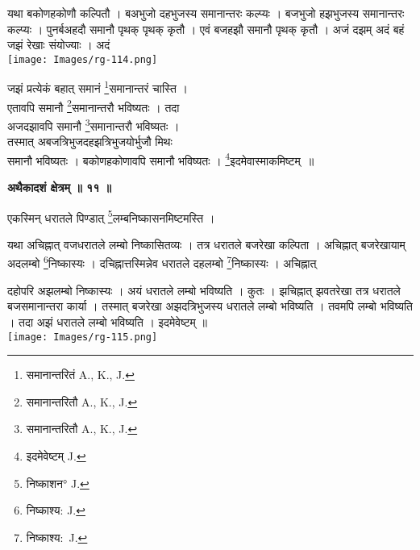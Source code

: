 \documentclass[11pt, openany]{book}
\begin{document}
 \begin{vwcol}[widths={0.7,0.3}, sep=.8cm, rule=0pt] 
 यथा बकोणहकोणौ कल्पितौ । बअभुजो दहभुजस्य समानान्तरः कल्प्यः  । बजभुजो हझभुजस्य समानान्तरः कल्प्यः  । पुनर्बअहदौ समानौ पृथक् पृथक् कृतौ  ।
एवं बजहझौ समानौ पृथक् कृतौ  । अजं दझम् अदं बहं जझं रेखाः संयोज्याः  । अदं \\
\vspace{-4mm}
\noindent \texttt{[image: Images/rg-114.png]}
\end{vwcol}
\vspace{-14mm}

\noindent जझं प्रत्येकं बहात् समानं \renewcommand{\thefootnote}{२}\footnote{समानान्तरितं {\en A., K., J.}}समानान्तरं चास्ति  ।\\
 एतावपि समानौ \renewcommand{\thefootnote}{३}\footnote{समानान्तरितौ {\en A., K., J.}}समानान्तरौ भविष्यतः  ।
  तदा\\ अजदझावपि समानौ
\renewcommand{\thefootnote}{३}\footnote{समानान्तरितौ {\en A., K., J.}}समानान्तरौ भविष्यतः  ।\\
तस्मात् अबजत्रिभुजदहझत्रिभुजयोर्भुजौ
मिथः\\ समानौ भविष्यतः । बकोणहकोणावपि समानौ भविष्यतः ।
\renewcommand{\thefootnote}{४}\footnote{इदमेवेष्टम् {\en J.} }इदमेवास्माकमिष्टम्~॥\\
\begin{center}
\textbf{\large अथैकादशं क्षेत्रम् ॥ ११ ॥}
\end{center}
\vspace{3mm}

{\ab एकस्मिन् धरातले पिण्डात् \renewcommand{\thefootnote}{५}\footnote{निष्काशन° {\en J.} }लम्बनिष्कासनमिष्टमस्ति  ।}\\
\vspace{3mm}

 यथा अचिह्नात् वजधरातले लम्बो निष्कासितव्यः । तत्र धरातले
बजरेखा कल्पिता । अचिह्नात् बजरेखायाम्
अदलम्बो \renewcommand{\thefootnote}{६}\footnote{निष्काश्य: {\en J.}}निष्कास्यः  । दचिह्नात्तस्मिन्नेव
धरातले दहलम्बो \renewcommand{\thefootnote}{६}\footnote{निष्काश्य:~{\en J.}}निष्कास्यः । अचिह्नात् 
\begin{vwcol}[widths={0.65,0.35}, sep=.8cm, rule=0pt] 
दहोपरि अझलम्बो निष्कास्यः  । अयं धरातले लम्बो भविष्यति  । कुतः  । झचिह्नात्
झवतरेखा तत्र धरातले बजसमानान्तरा कार्या  । तस्मात् बजरेखा अझदत्रिभुजस्य धरातले लम्बो भविष्यति  । तवमपि लम्बो भविष्यति  । तदा अझं धरातले लम्बो भविष्यति  । इदमेवेष्टम् ॥\\
\noindent \texttt{[image: Images/rg-115.png]}
\end{vwcol}
\vspace{2mm}
\end{document}
